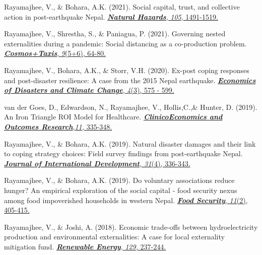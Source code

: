 \documentclass[12pt,letterpaper]{report}
\begin{document}
\begin{etaremune} [leftmargin=15 pt, start=30, itemsep=3pt]
\item Rayamajhee, V., \& Bohara, A.K. (2021). Social capital, trust, and collective action in post-earthquake Nepal.
\href{https://doi.org/10.1007/s11069-020-04363-4}
{\textit{\textbf{Natural Hazards}}, \textit{105}, 1491-1519.
}

\item Rayamajhee, V., Shrestha, S., \& Paniagua, P. (2021). Governing nested externalities during a pandemic: Social distancing as a co-production problem.
\href{https://cosmosandtaxis.files.wordpress.com/2021/05/rayamajhee_et_al_ct_vol9_iss_5_6.pdf}
{\textit{\textbf{Cosmos+Taxis}}, \textit{9}(5+6), 64-80.
}

\item  Rayamajhee, V., Bohara, A.K., \& Storr, V.H. (2020). Ex-post coping responses and post-disaster resilience: A case from the 2015 Nepal earthquake.
\href{https://doi.org/10.1007/s41885-020-00064-1}
{\textit{\textbf{Economics of Disasters and Climate Change}}, \textit{4}(3), 575 - 599.
}

\item van der Goes, D., Edwardson, N., Rayamajhee, V., Hollis,C.,\& Hunter, D. (2019).  An Iron Triangle ROI Model for Healthcare.
\href{https://doi.org/10.2147/CEOR.S130623}
{\textit{\textbf{ClinicoEconomics and Outcomes Research}},\textit{11,} 335-348.
}

\item Rayamajhee, V., \& Bohara, A.K. (2019). Natural disaster damages and their link to coping strategy choices: Field survey findings from post-earthquake Nepal.
\href{https://doi.org/10.1002/jid.3406}
{\textit{\textbf{Journal of International Development}}\textit{, 31}(4), 336-343.
}

\item Rayamajhee, V., \& Bohara, A.K. (2019). Do voluntary associations reduce hunger? An empirical exploration of the social capital - food security nexus among food impoverished households in western Nepal.
\href{https://doi.org/10.1007/s12571-019-00907-0}
{\textit{\textbf{Food Security}}, \textit{11}(2), 405-415.
}

\item Rayamajhee, V., \& Joshi, A. (2018). Economic trade-offs between hydroelectricity production and environmental externalities: A case for local externality mitigation fund.
\href{https://doi.org/10.1016/j.renene.2018.06.009}
{\textit{\textbf{Renewable Energy}}, \textit{129,} 237-244.
}



\end{etaremune}
\end{document}

